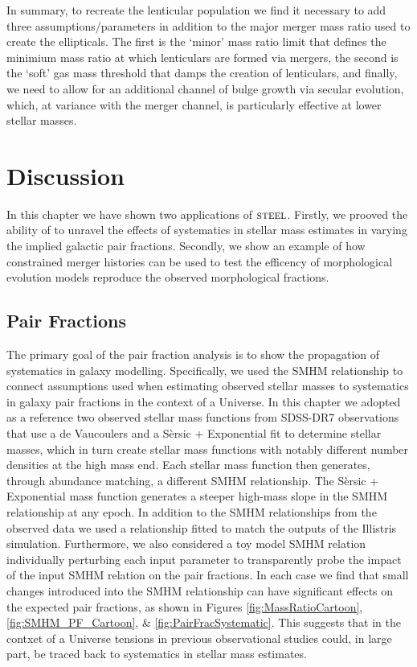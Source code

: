 In summary, to recreate the lenticular population we find it necessary to add three assumptions/parameters in addition to the major merger mass ratio used to create the ellipticals. The first is the `minor' mass ratio limit that defines the minimium mass ratio at which lenticulars are formed via mergers, the second is the `soft' gas mass threshold that damps the creation of lenticulars, and finally, we need to allow for an additional channel of bulge growth via secular evolution, which, at variance with the merger channel, is particularly effective at lower stellar masses. 

\section{Discussion}

In this chapter we have shown two applications of $\textsc{steel}$. Firstly, we prooved the ability of \steel to unravel the effects of systematics in stellar mass estimates in varying the implied galactic pair fractions. Secondly, we show an example of how constrained merger histories can be used to test the efficency of morphological evolution models reproduce the observed morphological fractions.  

\subsection{Pair Fractions}

The primary goal of the pair fraction analysis is to show the propagation of systematics in galaxy modelling. 
Specifically, we used the SMHM relationship to connect assumptions used when estimating observed stellar masses to systematics in galaxy pair fractions in the context of a \LCDM Universe. 
In this chapter we adopted as a reference two observed stellar mass functions from SDSS-DR7 observations that use a de Vaucoulers and a S\`ersic + Exponential fit to determine stellar masses, which in turn create stellar mass functions with notably different number densities at the high mass end. Each stellar mass function then generates, through abundance matching, a different SMHM relationship. The S\`ersic + Exponential mass function generates a steeper high-mass slope in the SMHM relationship at any epoch.
In addition to the SMHM relationships from the observed data we used a relationship fitted to match the outputs of the Illistris simulation. Furthermore, we also considered a toy model SMHM relation individually perturbing each input parameter to transparently probe the impact of the input SMHM relation on the pair fractions.
In each case we find that small changes introduced into the SMHM relationship can have significant effects on the expected pair fractions, as shown in Figures \ref{fig:MassRatioCartoon},\ref{fig:SMHM_PF_Cartoon}, \& \ref{fig:PairFracSystematic}.
This suggests that in the contxet of a \LCDM Universe tensions in previous observational studies could, in large part, be traced back to systematics in stellar mass estimates.


